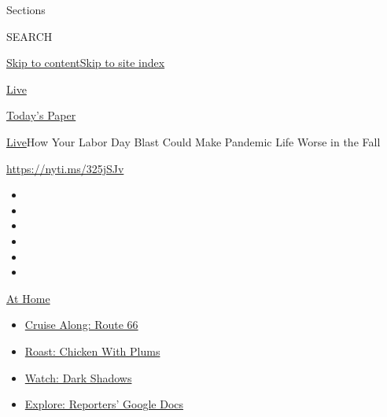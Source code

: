 Sections

SEARCH

\protect\hyperlink{site-content}{Skip to
content}\protect\hyperlink{site-index}{Skip to site index}

\href{https://www.nytimes3xbfgragh.onion/section/well/live}{Live}

\href{https://myaccount.nytimes3xbfgragh.onion/auth/login?response_type=cookie\&client_id=vi}{}

\href{https://www.nytimes3xbfgragh.onion/section/todayspaper}{Today's
Paper}

\href{/section/well/live}{Live}\textbar{}How Your Labor Day Blast Could
Make Pandemic Life Worse in the Fall

\url{https://nyti.ms/325jSJv}

\begin{itemize}
\item
\item
\item
\item
\item
\item
\end{itemize}

\href{https://www.nytimes3xbfgragh.onion/spotlight/at-home?action=click\&pgtype=Article\&state=default\&region=TOP_BANNER\&context=at_home_menu}{At
Home}

\begin{itemize}
\tightlist
\item
  \href{https://www.nytimes3xbfgragh.onion/2020/09/07/travel/route-66.html?action=click\&pgtype=Article\&state=default\&region=TOP_BANNER\&context=at_home_menu}{Cruise
  Along: Route 66}
\item
  \href{https://www.nytimes3xbfgragh.onion/2020/09/04/dining/sheet-pan-chicken.html?action=click\&pgtype=Article\&state=default\&region=TOP_BANNER\&context=at_home_menu}{Roast:
  Chicken With Plums}
\item
  \href{https://www.nytimes3xbfgragh.onion/2020/09/04/arts/television/dark-shadows-stream.html?action=click\&pgtype=Article\&state=default\&region=TOP_BANNER\&context=at_home_menu}{Watch:
  Dark Shadows}
\item
  \href{https://www.nytimes3xbfgragh.onion/interactive/2020/at-home/even-more-reporters-editors-diaries-lists-recommendations.html?action=click\&pgtype=Article\&state=default\&region=TOP_BANNER\&context=at_home_menu}{Explore:
  Reporters' Google Docs}
\end{itemize}

